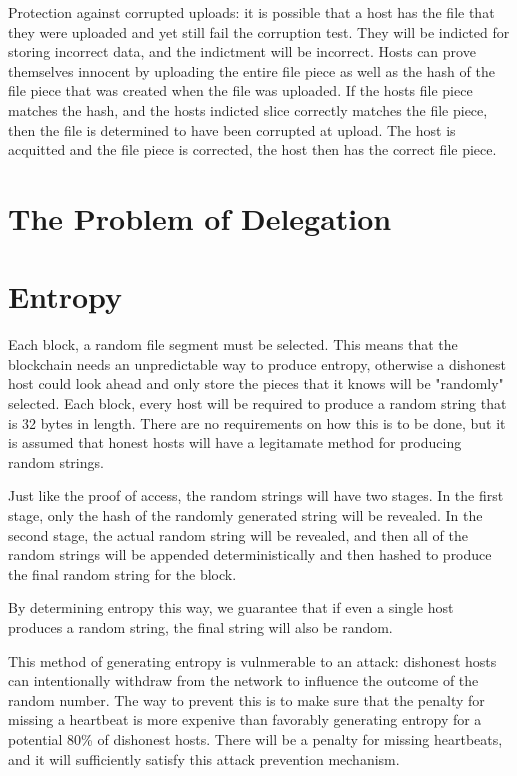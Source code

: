 \documentclass[twocolumn]{article}
\begin{document}
Protection against corrupted uploads: it is possible that a host has the file that they were uploaded and yet still fail the corruption test.
They will be indicted for storing incorrect data, and the indictment will be incorrect.
Hosts can prove themselves innocent by uploading the entire file piece as well as the hash of the file piece that was created when the file was uploaded.
If the hosts file piece matches the hash, and the hosts indicted slice correctly matches the file piece, then the file is determined to have been corrupted at upload.
The host is acquitted and the file piece is corrected, the host then has the correct file piece.

\section{The Problem of Delegation}

\section{Entropy}

Each block, a random file segment must be selected.
This means that the blockchain needs an unpredictable way to produce entropy, otherwise a dishonest host could look ahead and only store the pieces that it knows will be "randomly" selected.
Each block, every host will be required to produce a random string that is 32 bytes in length.
There are no requirements on how this is to be done, but it is assumed that honest hosts will have a legitamate method for producing random strings.

Just like the proof of access, the random strings will have two stages.
In the first stage, only the hash of the randomly generated string will be revealed.
In the second stage, the actual random string will be revealed, and then all of the random strings will be appended deterministically and then hashed to produce the final random string for the block.

By determining entropy this way, we guarantee that if even a single host produces a random string, the final string will also be random.

This method of generating entropy is vulnmerable to an attack: dishonest hosts can intentionally withdraw from the network to influence the outcome of the random number.
The way to prevent this is to make sure that the penalty for missing a heartbeat is more expenive than favorably generating entropy for a potential 80\% of dishonest hosts.
There will be a penalty for missing heartbeats, and it will sufficiently satisfy this attack prevention mechanism.
\end{document}
